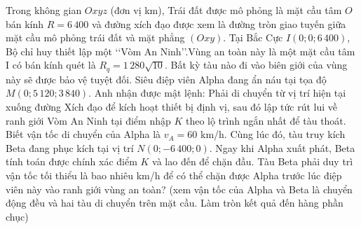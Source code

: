 \begin{ex}%
	Trong không gian $Oxyz$ (đơn vị km), Trái đất được mô phỏng là mặt cầu tâm $O$ bán kính $R=6\,400$ và đường xích đạo được xem là đường tròn giao tuyến giữa mặt cầu mô phỏng trái đất và mặt phẳng $(Oxy)$. Tại Bắc Cực $I(0;0;6\,400)$, Bộ chỉ huy thiết lập một \lq\lq Vòm An Ninh\rq\rq.Vùng an toàn này là một mặt cầu tâm I có bán kính quét là $R_q =1\,280\sqrt{10} $. Bất kỳ tàu nào đi vào biên giới của vùng này sẽ được bảo vệ tuyệt đối. Siêu điệp viên Alpha đang ẩn náu tại tọa độ $M(0;5\,120;3\,840)$. Anh nhận được mật lệnh:  Phải di chuyển từ vị trí hiện tại xuống đường Xích đạo để kích hoạt thiết bị định vị, sau đó lập tức rút lui về ranh giới Vòm An Ninh tại điểm nhập $K$ theo lộ trình ngắn nhất để tàu thoát. Biết vận tốc di chuyển của Alpha là $v_A =60$ km/h. Cùng lúc đó, tàu truy kích Beta đang phục kích tại vị trí $N(0;-6\,400;0)$. Ngay khi Alpha xuất phát, Beta tính toán được chính xác điểm $K$ và lao đến để chặn đầu. Tàu Beta phải duy trì vận tốc tối thiểu là bao nhiêu km/h để có thể chặn được Alpha trước lúc điệp viên này vào ranh giới vùng an toàn? (xem vận tốc của Alpha và Beta là chuyển động đều và hai tàu di chuyển trên mặt cầu. Làm tròn kết quả đến hàng phần chục)
	\par{}
\end{ex}
